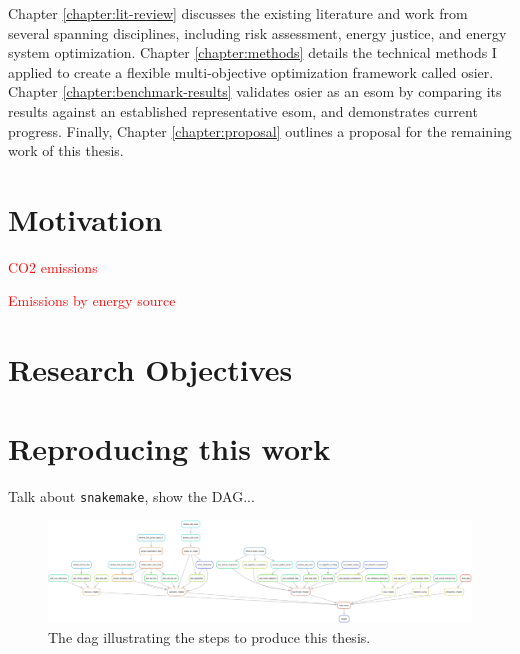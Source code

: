 Chapter \ref{chapter:lit-review} discusses the existing literature and work from
several spanning disciplines, including risk assessment, energy justice, and
energy system optimization. Chapter \ref{chapter:methods} details the technical
methods I applied to create a flexible multi-objective optimization framework
called \ac{osier}. Chapter \ref{chapter:benchmark-results} validates \ac{osier}
as an \ac{esom} by comparing its results against an established representative
\ac{esom}, and demonstrates current progress. Finally, Chapter
\ref{chapter:proposal} outlines a proposal for the remaining work of this
thesis.

\section{Motivation}

\textcolor{red}{CO2 emissions}

\textcolor{red}{Emissions by energy source}

\section{Research Objectives}

\section{Reproducing this work}
Talk about \texttt{snakemake}, show the DAG... 

    \begin{figure}[h!]
        \centering
        \includegraphics[width=\columnwidth]{../analysis/dag.png}
        \caption{The \ac{dag} illustrating the steps to produce this thesis.}
        \label{fig:dag}
    \end{figure}
